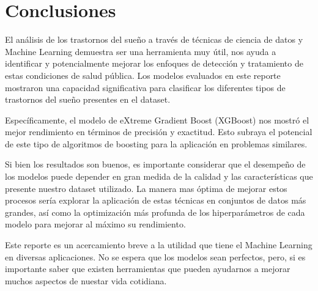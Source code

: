 \documentclass{replab}
\begin{document}
\section{Conclusiones}

El análisis de los trastornos del sueño a través de técnicas de ciencia de datos y Machine Learning demuestra ser una herramienta muy útil, nos ayuda a identificar y potencialmente mejorar los enfoques de detección y tratamiento de estas condiciones de salud pública. Los modelos evaluados en este reporte mostraron una capacidad significativa para clasificar los diferentes tipos de trastornos del sueño presentes en el dataset.

Específicamente, el modelo de eXtreme Gradient Boost (XGBoost) nos mostró el mejor rendimiento en términos de precisión y exactitud. Esto subraya el potencial de este tipo de algoritmos de boosting para la aplicación en problemas similares.

Si bien los resultados son buenos, es importante considerar que el desempeño de los modelos puede depender en gran medida de la calidad y las características que presente nuestro dataset utilizado. La manera mas óptima de mejorar estos procesos sería explorar la aplicación de estas técnicas en conjuntos de datos más grandes, así como la optimización más profunda de los hiperparámetros de cada modelo para mejorar al máximo su rendimiento.

Este reporte es un acercamiento breve a la utilidad que tiene el Machine Learning en diversas aplicaciones. No se espera que los modelos sean perfectos, pero, si es importante saber que existen herramientas que pueden ayudarnos a mejorar muchos aspectos de nuestar vida cotidiana.


  {\list
     {}
     {\setlength{\labelwidth}{\labelnumberwidth}%
      \setlength{\leftmargin}{\labelwidth}%
      \setlength{\labelsep}{\biblabelsep}%
      \addtolength{\leftmargin}{\labelsep}%
      \setlength{\itemsep}{\bibitemsep}%
      \setlength{\parsep}{\bibparsep}}%
      \renewcommand*{\makelabel}[1]{\hss##1}}
  {\endlist}
  {\item}

\printbibliography[heading=bibintoc]
\end{document}
